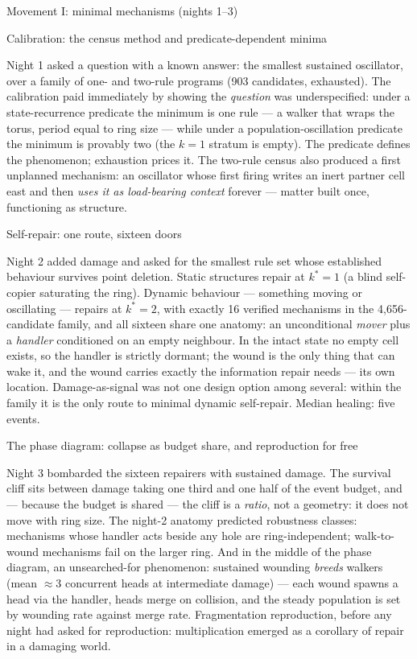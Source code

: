 \sec Movement I: minimal mechanisms (nights 1--3)

\secc Calibration: the census method and predicate-dependent minima

Night 1 asked a question with a known answer: the smallest sustained
oscillator, over a family of one- and two-rule programs (903
candidates, exhausted). The calibration paid immediately by showing
the {\it question} was underspecified: under a state-recurrence
predicate the minimum is one rule --- a walker that wraps the torus,
period equal to ring size --- while under a population-oscillation
predicate the minimum is provably two (the $k{=}1$ stratum is
empty). The predicate defines the phenomenon; exhaustion prices it.
The two-rule census also produced a first unplanned mechanism: an
oscillator whose first firing writes an inert partner cell east and
then {\it uses it as load-bearing context} forever --- matter built
once, functioning as structure.

\secc Self-repair: one route, sixteen doors

Night 2 added damage and asked for the smallest rule set whose
established behaviour survives point deletion. Static structures
repair at $k^*{=}1$ (a blind self-copier saturating the ring).
Dynamic behaviour --- something moving or oscillating --- repairs at
$k^*{=}2$, with exactly 16 verified mechanisms in the 4{,}656-candidate
family, and all sixteen share one anatomy: an unconditional {\it
mover} plus a {\it handler} conditioned on an empty neighbour. In
the intact state no empty cell exists, so the handler is strictly
dormant; the wound is the only thing that can wake it, and the wound
carries exactly the information repair needs --- its own location.
Damage-as-signal was not one design option among several: within the
family it is the only route to minimal dynamic self-repair. Median
healing: five events.

\secc The phase diagram: collapse as budget share, and reproduction for free

Night 3 bombarded the sixteen repairers with sustained damage. The
survival cliff sits between damage taking one third and one half of
the event budget, and --- because the budget is shared --- the cliff
is a {\it ratio}, not a geometry: it does not move with ring size.
The night-2 anatomy predicted robustness classes: mechanisms whose
handler acts beside any hole are ring-independent; walk-to-wound
mechanisms fail on the larger ring. And in the middle of the phase
diagram, an unsearched-for phenomenon: sustained wounding {\it
breeds} walkers (mean $\approx$3 concurrent heads at intermediate
damage) --- each wound spawns a head via the handler, heads merge on
collision, and the steady population is set by wounding rate against
merge rate. Fragmentation reproduction, before any night had asked
for reproduction: multiplication emerged as a corollary of repair
in a damaging world.

